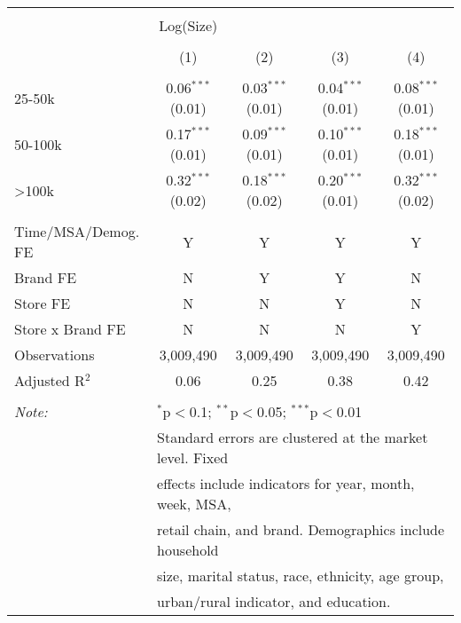 
\begin{table}[!htbp] \centering 
  \caption{} 
  \label{tab:packageSizeFull7734} 
\begin{tabular}{@{\extracolsep{5pt}}lcccc} 
\\[-1.8ex]\hline 
\hline \\[-1.8ex] 
 & Log(Size) &  &  &  \\ 
\\[-1.8ex] & (1) & (2) & (3) & (4)\\ 
\hline \\[-1.8ex] 
 25-50k & 0.06$^{***}$ (0.01) & 0.03$^{***}$ (0.01) & 0.04$^{***}$ (0.01) & 0.08$^{***}$ (0.01) \\ 
  50-100k & 0.17$^{***}$ (0.01) & 0.09$^{***}$ (0.01) & 0.10$^{***}$ (0.01) & 0.18$^{***}$ (0.01) \\ 
  >100k & 0.32$^{***}$ (0.02) & 0.18$^{***}$ (0.02) & 0.20$^{***}$ (0.01) & 0.32$^{***}$ (0.02) \\ 
 \hline \\[-1.8ex] 
Time/MSA/Demog. FE & Y & Y & Y & Y \\ 
Brand FE & N & Y & Y & N \\ 
Store FE & N & N & Y & N \\ 
Store x Brand FE & N & N & N & Y \\ 
Observations & 3,009,490 & 3,009,490 & 3,009,490 & 3,009,490 \\ 
Adjusted R$^{2}$ & 0.06 & 0.25 & 0.38 & 0.42 \\ 
\hline 
\hline \\[-1.8ex] 
\textit{Note:}  & \multicolumn{4}{l}{$^{*}$p$<$0.1; $^{**}$p$<$0.05; $^{***}$p$<$0.01} \\ 
 & \multicolumn{4}{l}{Standard errors are clustered at the market level. Fixed } \\ 
 & \multicolumn{4}{l}{effects include indicators for year, month, week, MSA, } \\ 
 & \multicolumn{4}{l}{retail chain, and brand. Demographics include household } \\ 
 & \multicolumn{4}{l}{size, marital status, race, ethnicity, age group, } \\ 
 & \multicolumn{4}{l}{urban/rural indicator, and education.} \\ 
\end{tabular} 
\end{table} 
